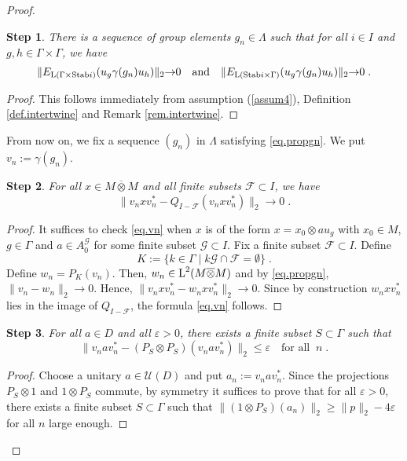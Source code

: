 \documentclass[a4paper,11pt]{amsart}
\numberwithin{equation}{section}
\newtheorem{step}{Step}[section]
\begin{document}
\begin{proof}
\begin{step}\label{stepb}
There is a sequence of group elements $g_n \in \Lambda$ such that for all $i \in I$ and $g,h \in \Gamma \times \Gamma$, we have
\begin{equation}\label{eq.propgn}
\|E_{{\mathord{\text{\rm L}}} (\Gamma \times {\operatorname{Stab}} i)}(u_g \gamma(g_n) u_h)\|_2 {\rightarrow} 0 \quad\text{and}\quad  \|E_{{\mathord{\text{\rm L}}}({\operatorname{Stab}} i \times \Gamma)}(u_g \gamma(g_n) u_h)\|_2 {\rightarrow} 0\; .
\end{equation}
\end{step}
\begin{proof}
This follows immediately from assumption (\ref{assum4}), Definition \ref{def.intertwine} and Remark \ref{rem.intertwine}.
\end{proof}

From now on, we fix a sequence $(g_n)$ in $\Lambda$ satisfying \eqref{eq.propgn}. We put $v_n := \gamma(g_n)$.

\begin{step}\label{stepc}
For all $x \in M {\mathbin{\overline{\otimes}}} M$ and all finite subsets ${\mathcal{F}} \subset I$, we have
\begin{equation}\label{eq.vn}
\| v_n x v_n^* - Q_{I - {\mathcal{F}}}(v_n x v_n^*)\|_2 {\rightarrow} 0 \; .
\end{equation}
\end{step}
\begin{proof}
It suffices to check \eqref{eq.vn} when $x$ is of the form $x = x_0 {\otimes} a u_g$ with $x_0 \in M$, $g \in \Gamma$ and $a \in A_0^{\mathcal{G}}$ for some finite subset ${\mathcal{G}} \subset I$. Fix a finite subset ${\mathcal{F}} \subset I$. Define
$$K := \{k \in \Gamma \mid k {\mathcal{G}} \cap {\mathcal{F}} = \emptyset \} \; .$$
Define $w_n = P_K(v_n)$. Then, $w_n \in {\mathord{\text{\rm L}}}^2(M {\mathbin{\overline{\otimes}}} M)$ and by \eqref{eq.propgn}, $\|v_n -w_n\|_2 {\rightarrow} 0$. Hence, $\| v_n x v_n^* - w_n x v_n^*\|_2 {\rightarrow} 0$. Since by construction $w_n x v_n^*$ lies in the image of $Q_{I - {\mathcal{F}}}$, the formula \eqref{eq.vn} follows.
\end{proof}

\begin{step} \label{stepd}
For all $a \in D$ and all ${\varepsilon} > 0$, there exists a finite subset $S \subset \Gamma$ such that
$$\|v_n a v_n^* - (P_S {\otimes} P_S)(v_n a v_n^*)\|_2 {\leqslant} {\varepsilon} \quad\text{for all}\;\; n \; .$$
\end{step}
\begin{proof}
Choose a unitary $a \in {\mathcal{U}}(D)$ and put $a_n := v_n a v_n^*$. Since the projections $P_S {\otimes} 1$ and $1 {\otimes} P_S$ commute, by symmetry it suffices to prove that for all ${\varepsilon}>0$, there exists a finite subset $S \subset \Gamma$ such that $\|(1 {\otimes} P_S)(a_n)\|_2 {\geqslant} \|p\|_2 - 4{\varepsilon}$ for all $n$ large enough.


\end{proof}
\end{proof}
\end{document}

